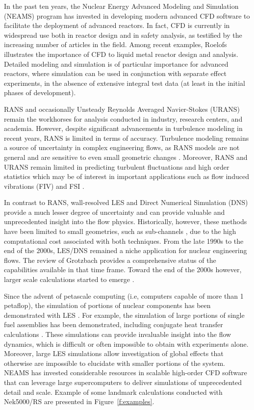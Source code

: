 In the past ten years, the Nuclear Energy Advanced Modeling and Simulation
(NEAMS) program \cite{sofu2017us} has invested in developing modern advanced
CFD software to facilitate the deployment of advanced reactors. In fact, CFD is
currently in widespread use both in reactor design and in safety analysis, as
testified by the increasing number of articles in the field. Among recent
examples, Roelofs \cite{roelofs2018thermal} illustrates the importance of CFD
to liquid metal reactor design and analysis. Detailed modeling and simulation
is of particular importance for advanced reactors, where simulation can be used
in conjunction with separate effect experiments, in the absence of extensive
integral test data (at least in the initial phases of development).

RANS \cite{conner2010cfd} and occasionally Unsteady Reynolds Averaged
Navier-Stokes (URANS) remain the workhorses for analysis conducted in industry,
research centers, and academia.  However, despite significant advancements in
turbulence modeling in recent years, RANS is limited in terms of accuracy.
Turbulence modeling remains a source of uncertainty in complex engineering
flows, as RANS models are not general and are sensitive to even small geometric
changes \cite{merzari2010numerical}. Moreover, RANS and URANS remain limited in
predicting turbulent fluctuations and high order statistics which may be of
interest in important applications such as flow induced vibrations (FIV) and
FSI \cite{yuan2017flow}.

In contrast to RANS, wall-resolved LES and Direct Numerical Simulation (DNS)
provide a much lesser degree of uncertainty and can provide valuable and
unprecedented insight into the flow physics. Historically, however, these
methods have been limited to small geometries, such as sub-channels
\cite{grotzbach1999direct}, due to the high computational cost associated with
both techniques. From the late 1990s to the end of the 2000s, LES/DNS remained
a niche application for nuclear engineering flows. The review of Grotzbach
\cite{grotzbach1999direct} provides a comprehensive status of the capabilities
available in that time frame. Toward the end of the 2000s however, larger scale
calculations started to emerge \cite{pointer2009simulations}.

Since the advent of petascale computing (i.e, computers
capable of more than 1 petaflop), the simulation of portions of nuclear
components has been demonstrated with LES \cite{merzari2017large}. For example,
the simulation of large portions of single fuel assemblies has been demonstrated,
including conjugate heat transfer calculations \cite{obabko2019}. These
simulations can provide invaluable insight into the flow dynamics, which is
difficult or often impossible to obtain with experiments alone. Moreover, large
LES simulations allow investigation of global effects that otherwise are
impossible to elucidate with smaller portions of the system. NEAMS has invested
considerable resources in scalable high-order CFD software that can leverage
large supercomputers to deliver simulations of unprecedented detail and
scale. Example of some landmark calculations conducted with Nek5000/RS are presented in
Figure~\ref{f:examples}.

